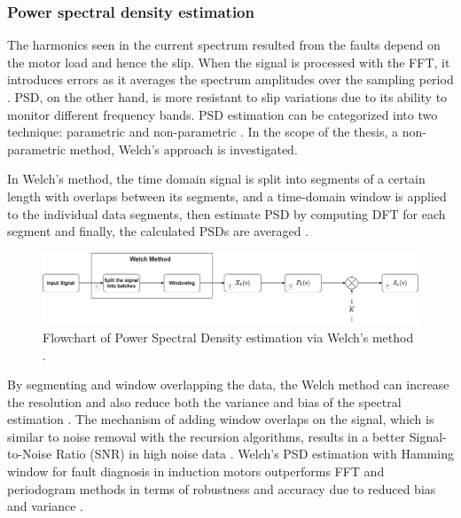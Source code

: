 \subsubsection{Power spectral density estimation}

The harmonics seen in the current spectrum resulted from the faults depend on the motor load and hence the slip. When the signal is processed with the FFT, it introduces errors as it averages the spectrum amplitudes over the sampling period \cite{cusidocusido2008fault,irvine2002introduction}. PSD, on the other hand, is more resistant to slip variations due to its ability to monitor different frequency bands. PSD estimation can be categorized into two technique: parametric and non-parametric \cite{zerdani2020inter,heydarzadeh2016gearbox}. In the scope of the thesis, a non-parametric method, Welch's approach is investigated.

In Welch's method, the time domain signal is split into segments of a certain length with overlaps between its segments, and a time-domain window is applied to the individual data segments, then estimate PSD by computing DFT for each segment and finally, the calculated PSDs are averaged \cite{jwo2021windowing,stoica2005spectral,schmid2012use}.

\begin{figure}[h]
	\centering
	\includegraphics[width=400pt,keepaspectratio=true]{./fig/welchdiagram.png}
	\caption{Flowchart of Power Spectral Density estimation via Welch's method \cite{jwo2021windowing}.}	
	\label{welchdiagram}
\end{figure}

By segmenting and window overlapping the data, the Welch method can increase the resolution and also reduce both the variance and bias of the spectral estimation \cite{stoica2005spectral,al2010advanced,zerdani2020inter}. The mechanism of adding window overlaps on the signal, which is similar to noise removal with the recursion algorithms, results in a better Signal-to-Noise Ratio (SNR) in high noise data \cite{jwo2021windowing,jin2020intelligent,irvine2002introduction}. Welch's PSD estimation with Hamming window for fault diagnosis in induction motors outperforms FFT and periodogram methods in terms of robustness and accuracy due to reduced bias and variance \cite{ayhan2003case}.

